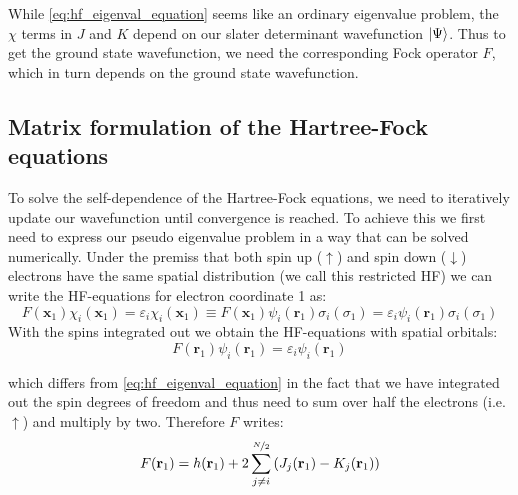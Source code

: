 While \autoref{eq:hf_eigenval_equation} seems like an ordinary eigenvalue problem, the $\chi$ terms in $J$ and $K$ depend on our slater determinant wavefunction $\ket{\Psi}$. Thus to get the ground state wavefunction, we need the corresponding Fock operator $F$, which in turn depends on the ground state wavefunction. 


\subsection{Matrix formulation of the Hartree-Fock equations}
\label{subsec:background_hf_computational}
To solve the self-dependence of the Hartree-Fock equations, we need to iteratively update our wavefunction until convergence is reached. To achieve this we first need to express our pseudo eigenvalue problem in a way that can be solved numerically. Under the premiss that both spin up ($\uparrow$) and spin down ($\downarrow$) electrons have the same spatial distribution (we call this restricted HF) we can write the HF-equations for electron coordinate 1 as:
\begin{equation}
    F(\mathbf{x}_1) \chi_i(\mathbf{x}_1) = \varepsilon_i \chi_i(\mathbf{x}_1) \equiv F(\mathbf{x}_1) \psi_i(\mathbf{r}_1) \sigma_i(\sigma_1) = \varepsilon_i \psi_i(\mathbf{r}_1) \sigma_i(\sigma_1)
\end{equation}
With the spins integrated out we obtain the HF-equations with spatial orbitals: 
\begin{equation}
    \label{eq:hf_eigenval_equation_spatial}
    F(\mathbf{r}_1) \psi_i(\mathbf{r}_1) = \varepsilon_i \psi_i(\mathbf{r}_1)
\end{equation}

which differs from \autoref{eq:hf_eigenval_equation} in the fact that we have integrated out the spin degrees of freedom and thus need to sum over half the electrons (i.e. $\uparrow$) and multiply by two. Therefore $F$ writes:
\begin{equation}
    \label{eq:fock_operator_spatial}
    F(\mathbf{r}_1) = h(\mathbf{r}_1) + 2 \sum_{j\neq i}^{\nicefrac{N}{2}} \left( J_j(\mathbf{r}_1) - K_j(\mathbf{r}_1) \right)
\end{equation}

